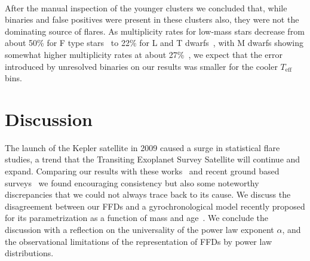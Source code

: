 \documentclass{aa}
\begin{document}
\\
After the manual inspection of the younger clusters we concluded that, while binaries and false positives were present in these clusters also, they were not the dominating source of flares. As multiplicity rates for low-mass stars decrease from about 50\% for F type stars~\citep{raghavan2010} to 22\% for L and T dwarfs~\citep{duchene2013}, with M dwarfs showing somewhat higher multiplicity rates at about 27\%~\citep{winters2019}, we expect that the error introduced by unresolved binaries on our results was smaller for the cooler $T_\mathrm{eff}$ bins.
\section{Discussion}
\label{sec:discussion}
The launch of the Kepler satellite in 2009 caused a surge in statistical flare studies, a trend that the Transiting Exoplanet Survey Satellite will continue and expand. Comparing our results with these works~\citep{shibayama2013,lurie2015,lin2019,raetz2020} and recent ground based surveys~\citep{chang2015,howard2019} we found encouraging consistency but also some noteworthy discrepancies that we could not always trace back to its cause. We discuss the disagreement between our FFDs and a gyrochronological model recently proposed for its parametrization as a function of mass and age~\citep{davenport2019}. We conclude the discussion with a reflection on the universality of the power law exponent $\alpha$, and the observational limitations of the representation of FFDs by power law distributions.
\end{document}
